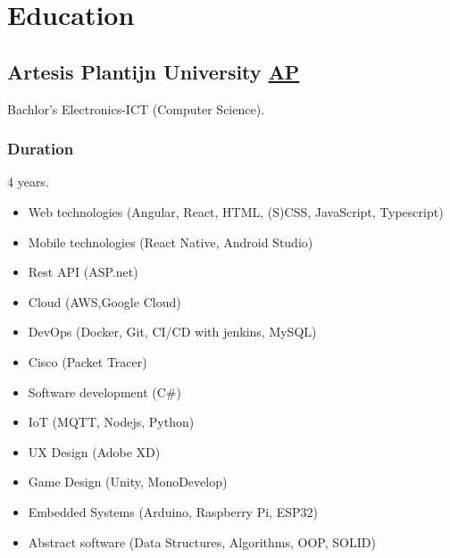 \pagebreak
\section{Educat\textcolor{mycolor}{ion}}
  \subsection{Artesis Plantijn University \href{https://ap.be}{AP}}
    \hspace*{\fill}{\textcolor{mygrey}{2018-2022}}

    Bachlor's Electronics-ICT (Computer Science).
    \subsubsection{Duration}
      4 years.
      \begin{itemize}
        \item Web technologies (Angular, React, HTML, (S)CSS, JavaScript, Typescript)
        \item Mobile technologies (React Native, Android Studio)
        \item Rest API (ASP.net)
        \item Cloud (AWS,Google Cloud)
        \item DevOps (Docker, Git, CI/CD with jenkins, MySQL)
        \item Cisco (Packet Tracer)
        \item Software development (C\#)
        \item IoT (MQTT, Nodejs, Python)
        \item UX Design (Adobe XD)
        \item Game Design (Unity, MonoDevelop)
        \item Embedded Systems (Arduino, Raspberry Pi, ESP32)
        \item Abstract software (Data Structures, Algorithms, OOP, SOLID)
      \end{itemize}
  
